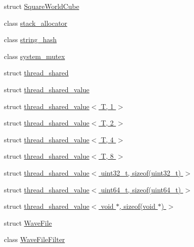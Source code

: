 \begin{DoxyCompactItemize}
\item 
struct \hyperlink{structcrap_1_1_square_world_cube}{Square\+World\+Cube}
\item 
class \hyperlink{classcrap_1_1stack__allocator}{stack\+\_\+allocator}
\item 
class \hyperlink{classcrap_1_1string__hash}{string\+\_\+hash}
\item 
class \hyperlink{classcrap_1_1system__mutex}{system\+\_\+mutex}
\item 
struct \hyperlink{structcrap_1_1thread__shared}{thread\+\_\+shared}
\item 
struct \hyperlink{structcrap_1_1thread__shared__value}{thread\+\_\+shared\+\_\+value}
\item 
struct \hyperlink{structcrap_1_1thread__shared__value_3_01_t_00_011_01_4}{thread\+\_\+shared\+\_\+value$<$ T, 1 $>$}
\item 
struct \hyperlink{structcrap_1_1thread__shared__value_3_01_t_00_012_01_4}{thread\+\_\+shared\+\_\+value$<$ T, 2 $>$}
\item 
struct \hyperlink{structcrap_1_1thread__shared__value_3_01_t_00_014_01_4}{thread\+\_\+shared\+\_\+value$<$ T, 4 $>$}
\item 
struct \hyperlink{structcrap_1_1thread__shared__value_3_01_t_00_018_01_4}{thread\+\_\+shared\+\_\+value$<$ T, 8 $>$}
\item 
struct \hyperlink{structcrap_1_1thread__shared__value_3_01uint32__t_00_01sizeof_07uint32__t_08_01_4}{thread\+\_\+shared\+\_\+value$<$ uint32\+\_\+t, sizeof(uint32\+\_\+t) $>$}
\item 
struct \hyperlink{structcrap_1_1thread__shared__value_3_01uint64__t_00_01sizeof_07uint64__t_08_01_4}{thread\+\_\+shared\+\_\+value$<$ uint64\+\_\+t, sizeof(uint64\+\_\+t) $>$}
\item 
struct \hyperlink{structcrap_1_1thread__shared__value_3_01void_01_5_00_01sizeof_07void_01_5_08_01_4}{thread\+\_\+shared\+\_\+value$<$ void $\ast$, sizeof(void $\ast$) $>$}
\item 
struct \hyperlink{structcrap_1_1_wave_file}{Wave\+File}
\item 
class \hyperlink{classcrap_1_1_wave_file_filter}{Wave\+File\+Filter}
\end{DoxyCompactItemize}
